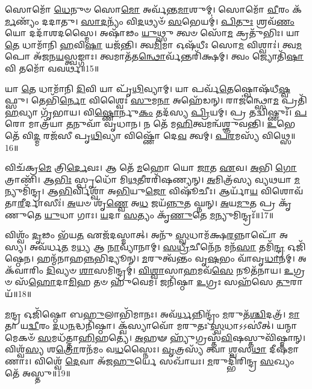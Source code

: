 𑌸𑍋𑌮𑍋᳴ \ul{𑌧𑍇}\-𑌨𑍁𑍞 𑌸𑍋\-\ul{𑌮𑍋} 𑌅𑌰𑍍𑌵᳴𑌨𑍍𑌤\-\ul{𑌮𑌾}\-𑌶𑍁𑌮𑍍।
𑌸𑍋𑌮𑍋᳴ \ul{𑌵𑍀}\-𑌰𑌂 𑌕᳴\-\ul{𑌰𑍍𑌮}\-𑌣𑍍𑌯𑌂᳴ 𑌦𑌦𑌾𑌤𑍁।
\-\ul{𑌸𑌾}\-\-\ul{𑌦}\-𑌨𑍍𑌯𑌂᳴ 𑌵𑌿\-\ul{𑌦}\-𑌥𑍍𑌯𑍞᳴ \ul{𑌸}\-𑌭𑍇𑌯𑌮𑍍॑।
\-\ul{𑌪𑌿}\-\-\ul{𑌤𑍁𑌃} 𑌶𑍍𑌰𑌵᳴\-\ul{𑌣𑌂} 𑌯𑍋 𑌦𑌦𑌾᳴𑌶𑌦𑌸𑍍𑌮𑍈।
𑌅𑌷𑌾᳴𑌢𑌂 \ul{𑌯𑍁}\-𑌥𑍍𑌸𑍁 𑌤𑍍𑌵𑍞 𑌸𑍋᳴\-\ul{𑌮} 𑌕𑍍𑌰𑌤𑍁᳴𑌭𑌿𑌃।
𑌯𑌾 \ul{𑌤𑍇} 𑌧𑌾𑌮𑌾᳴𑌨𑌿 \ul{𑌹}\-𑌵𑌿\-\ul{𑌷𑌾} 𑌯𑌜᳴𑌨𑍍𑌤𑌿।
𑌤𑍍𑌵\-\ul{𑌮𑌿}\-𑌮𑌾 𑌓𑌷᳴𑌧𑍀𑌃 𑌸𑍋\-\ul{𑌮} 𑌵𑌿𑌶𑍍𑌵𑌾𑌃॑।
𑌤𑍍𑌵\-\ul{𑌮}\-𑌪𑍋 𑌅᳴𑌜𑌨\-\ul{𑌯}\-𑌸𑍍𑌤𑍍𑌵𑌙𑍍𑌗𑌾𑌃।
𑌤𑍍𑌵𑌮𑌾𑌤᳴𑌤\-\ul{𑌨𑍍𑌥𑍋}\-𑌰𑍍𑌵᳴𑌨𑍍𑌤𑌰𑌿᳴𑌕𑍍𑌷𑌮𑍍।
𑌤𑍍𑌵𑌂 𑌜𑍍𑌯𑍋𑌤𑌿᳴\-\ul{𑌷𑌾} 𑌵𑌿 𑌤𑌮𑍋᳴ 𑌵𑌵𑌰𑍍𑌥॥15॥

𑌯𑌾 \ul{𑌤𑍇} 𑌧𑌾𑌮𑌾᳴𑌨𑌿 \ul{𑌦𑌿}\-𑌵𑌿 𑌯𑌾 𑌪𑍃᳴\-\ul{𑌥𑌿}\-𑌵𑍍𑌯𑌾𑌮𑍍।
𑌯𑌾 𑌪𑌰𑍍𑌵᳴\-\ul{𑌤𑍇}\-𑌷𑍍𑌵𑍋𑌷᳴𑌧𑍀\-\ul{𑌷𑍍𑌵}\-𑌫𑍍𑌸𑍁।
𑌤𑍇𑌭𑌿᳴\-\ul{𑌰𑍍𑌨𑍋} 𑌵𑌿𑌶𑍍𑌵𑍈𑌃॑ \ul{𑌸𑍁}\-𑌮\-\ul{𑌨𑌾} 𑌅𑌹𑍇᳴𑌡𑌨𑍍।
𑌰𑌾𑌜॑𑌨𑍍𑌥𑍍𑌸𑍋\-\ul{𑌮} 𑌪𑍍𑌰𑌤𑌿᳴ \ul{𑌹}\-𑌵𑍍𑌯𑌾 𑌗𑍃᳴𑌭𑌾𑌯।
𑌵𑌿\-\ul{𑌷𑍍𑌣𑍋}\-𑌰𑍍𑌨𑍁\-\ul{𑌕𑌂} 𑌤𑌦᳴𑌸𑍍𑌯 \ul{𑌪𑍍𑌰𑌿}\-𑌯𑌮𑍍।
𑌪𑍍𑌰 𑌤𑌦𑍍𑌵𑌿𑌷𑍍𑌣𑍁𑌃᳴।
\-\ul{𑌪}\-𑌰𑍋 𑌮𑌾𑌤𑍍𑌰᳴𑌯𑌾 \ul{𑌤}\-𑌨𑍁𑌵𑌾᳴ 𑌵𑍃𑌧𑌾𑌨।
𑌨 𑌤𑍇᳴ 𑌮\-\ul{𑌹𑌿}\-𑌤𑍍𑌵𑌮𑌨𑍍𑌵᳴𑌶𑍍𑌞𑍁𑌵𑌨𑍍𑌤𑌿।
\-\ul{𑌉}\-𑌭𑍇 𑌤𑍇᳴ 𑌵𑌿\-\ul{𑌦𑍍𑌮} 𑌰𑌜᳴𑌸𑍀 𑌪𑍃\-\ul{𑌥𑌿}\-𑌵𑍍𑌯𑌾 𑌵𑌿𑌷𑍍𑌣𑍋᳴ 𑌦𑍇\-\ul{𑌵} 𑌤𑍍𑌵𑌮𑍍।
\-\ul{𑌪}\-\-\ul{𑌰}\-𑌮𑌸𑍍𑌯᳴ 𑌵𑌿𑌥𑍍𑌸𑍇॥16॥

𑌵𑌿𑌚᳴𑌕𑍍𑌰\-\ul{𑌮𑍇} 𑌤𑍍𑌰𑌿\-\ul{𑌰𑍍𑌦𑍇}\-𑌵𑌃।
𑌆 𑌤𑍇᳴ \ul{𑌮}\-𑌹𑍋 𑌯𑍋 \ul{𑌜𑌾}\-𑌤 \ul{𑌏}\-𑌵।
\-\ul{𑌅}\-𑌭𑌿 \ul{𑌗𑍋}\-𑌤𑍍𑌰𑌾𑌣𑌿᳴।
𑌆\-\ul{𑌭𑌿𑌃} 𑌸𑍍𑌪𑍃𑌧𑍋᳴ 𑌮𑌿\-\ul{𑌥}\-𑌤𑍀𑌰𑌰𑌿᳴𑌷𑌣𑍍𑌯𑌨𑍍।
\-\ul{𑌅}\-𑌮𑌿𑌤𑍍𑌰᳴𑌸𑍍𑌯 𑌵𑍍𑌯𑌥𑌯𑌾 \ul{𑌮}\-𑌨𑍍𑌯𑍁𑌮𑌿᳴𑌨𑍍𑌦𑍍𑌰।
𑌆\-\ul{𑌭𑌿}\-𑌰𑍍𑌵𑌿𑌶𑍍𑌵𑌾᳴ 𑌅\-\ul{𑌭𑌿}\-𑌯𑍁\-\ul{𑌜𑍋} 𑌵𑌿𑌷𑍂᳴𑌚𑍀𑌃।
𑌆𑌰𑍍𑌯𑌾᳴\-\ul{𑌯} 𑌵𑌿𑌶𑍋𑌵᳴𑌤𑌾\-\ul{𑌰𑍀}\-𑌰𑍍𑌦𑌾𑌸𑍀𑌃॑।
\-\ul{𑌅}\-𑌯𑍞 𑌶𑍃᳴\-\ul{𑌣𑍍𑌵𑍇} 𑌅\-\ul{𑌧} 𑌜𑌯᳴\-\ul{𑌨𑍍𑌨𑍁}\-𑌤 𑌘𑍍𑌨𑌨𑍍।
\-\ul{𑌅}\-𑌯\-\ul{𑌮𑍁}\-𑌤 𑌪𑍍𑌰 𑌕𑍃᳴𑌣𑍁𑌤𑍇 \ul{𑌯𑍁}\-𑌧𑌾 𑌗𑌾𑌃।
\-\ul{𑌯}\-𑌦𑌾 \ul{𑌸}\-𑌤𑍍𑌯𑌂 𑌕𑍃᳴\-\ul{𑌣𑍁}\-𑌤𑍇 \ul{𑌮}\-𑌨𑍍𑌯𑍁𑌮𑌿𑌨𑍍𑌦𑍍𑌰𑌃᳴॥17॥

𑌵𑌿𑌶𑍍𑌵𑌂᳴ \ul{𑌦𑍃}\-𑌢𑌂 𑌭᳴𑌯\-\ul{𑌤} 𑌏𑌜᳴𑌦𑌸𑍍𑌮𑌾𑌤𑍍।
𑌅𑌨𑍁᳴ \ul{𑌸𑍍𑌵}\-𑌧𑌾𑌮᳴𑌕𑍍𑌷\-\ul{𑌰}\-𑌨𑍍𑌨𑌾𑌪𑍋᳴ 𑌅𑌸𑍍𑌯।
𑌅𑌵᳴𑌰𑍍𑌧\-\ul{𑌤} 𑌮\-\ul{𑌧𑍍𑌯} 𑌆 \ul{𑌨𑌾}\-𑌵𑍍𑌯𑌾᳴𑌨𑌾𑌮𑍍।
\-\ul{𑌸}\-\-\ul{𑌧𑍍𑌰𑍀}\-𑌚𑍀𑌨𑍇᳴\-\ul{𑌨} 𑌮𑌨᳴\-\ul{𑌸𑌾} 𑌤𑌮𑌿᳴\-\ul{𑌨𑍍𑌦𑍍𑌰} 𑌓𑌜𑌿᳴𑌷𑍍𑌠𑍇𑌨।
𑌹𑌨𑍍𑌮᳴𑌨𑌾𑌹\-\ul{𑌨𑍍𑌨}\-𑌭𑌿𑌦𑍍𑌯𑍂𑌨𑍍।
\-\ul{𑌮}\-𑌰𑍁𑌤𑍍𑌵᳴𑌨𑍍𑌤𑌂 𑌵𑍃\-\ul{𑌷}\-𑌭𑌂 𑌵𑌾᳴𑌵𑍃\-\ul{𑌧𑌾}\-𑌨𑌮𑍍।
𑌅𑌕᳴𑌵𑌾𑌰𑌿𑌂 \ul{𑌦𑌿}\-𑌵𑍍𑌯𑍞 \ul{𑌶𑌾}\-𑌸𑌮𑌿𑌨𑍍𑌦𑍍𑌰𑌮𑍍॑।
\-\ul{𑌵𑌿}\-\-\ul{𑌶𑍍𑌵𑌾}\-𑌸𑌾\-\ul{𑌹}\-𑌮𑌵᳴\-\ul{𑌸𑍇} 𑌨𑍂𑌤᳴𑌨𑌾𑌯।
\-\ul{𑌉}\-𑌗𑍍𑌰𑍞 𑌸᳴\-\ul{𑌹𑍋}\-𑌦𑌾\-\ul{𑌮𑌿}\-𑌹 𑌤𑍞 𑌹𑍁᳴𑌵𑍇𑌮।
𑌜𑌨𑌿᳴𑌷𑍍𑌠𑌾 \ul{𑌉}\-𑌗𑍍𑌰𑌃 𑌸𑌹᳴𑌸𑍇 \ul{𑌤𑍁}\-𑌰𑌾𑌯᳴॥18॥

\-\ul{𑌮}\-𑌨𑍍𑌦𑍍𑌰 𑌓𑌜𑌿᳴𑌷𑍍𑌠𑍋 𑌬\-\ul{𑌹𑍁}\-𑌲𑌾𑌭𑌿᳴𑌮𑌾𑌨𑌃।
𑌅𑌵᳴\-\ul{𑌰𑍍𑌧}\-𑌨𑍍𑌨𑌿𑌨𑍍𑌦𑍍𑌰𑌂᳴ \ul{𑌮}\-𑌰𑍁𑌤᳴\-\ul{𑌶𑍍𑌚𑌿}\-𑌦𑌤𑍍𑌰᳴।
\-\ul{𑌮𑌾}\-𑌤𑌾 𑌯\-\ul{𑌦𑍍𑌵𑍀}\-𑌰𑌂 \ul{𑌦}\-𑌧\-\ul{𑌨}\-𑌦𑍍𑌧𑌨𑌿᳴𑌷𑍍𑌠𑌾।
𑌕𑍍𑌵᳴𑌸𑍍𑌯𑌾𑌵𑍋᳴ 𑌮𑌰𑍁𑌤𑌃 \ul{𑌸𑍍𑌵}\-𑌧𑌾\-𑌽𑌽𑌸𑍀॑𑌤𑍍।
𑌯𑌨𑍍𑌮𑌾𑌮𑍇𑌕𑍞᳴ \ul{𑌸}\-𑌮𑌧᳴𑌤𑍍𑌤𑌾\-\ul{𑌹𑌿}\-𑌹𑌤𑍍𑌯𑍇॑।
\-\ul{𑌅}\-𑌹𑍟 𑌹𑍍𑌯𑍁᳴𑌗𑍍𑌰𑌸𑍍𑌤᳴\-\ul{𑌵𑌿}\-𑌷𑌸𑍍𑌤𑍁𑌵𑌿᳴𑌷𑍍𑌮𑌾𑌨𑍍।
𑌵𑌿𑌶𑍍𑌵᳴\-\ul{𑌸𑍍𑌯} 𑌶\-\ul{𑌤𑍍𑌰𑍋}\-𑌰𑌨᳴𑌮𑌂 𑌵\-\ul{𑌧}\-𑌸𑍍𑌨𑍈𑌃।
\-\ul{𑌵𑍃}\-𑌤𑍍𑌰𑌸𑍍𑌯᳴ 𑌤𑍍𑌵𑌾 \ul{𑌶𑍍𑌵}\-𑌸\-\ul{𑌥𑌾} 𑌦𑍀𑌷᳴𑌮𑌾𑌣𑌾𑌃।
𑌵𑌿𑌶𑍍𑌵𑍇᳴ \ul{𑌦𑍇}\-𑌵𑌾 𑌅᳴𑌜\-\ul{𑌹𑍁}\-𑌰𑍍𑌯𑍇 𑌸𑌖𑌾᳴𑌯𑌃।
\-\ul{𑌮}\-𑌰𑍁𑌦𑍍𑌭𑌿᳴𑌰𑌿𑌨𑍍𑌦𑍍𑌰 \ul{𑌸}\-𑌖𑍍𑌯𑌂 𑌤𑍇᳴ 𑌅𑌸𑍍𑌤𑍁॥19॥


